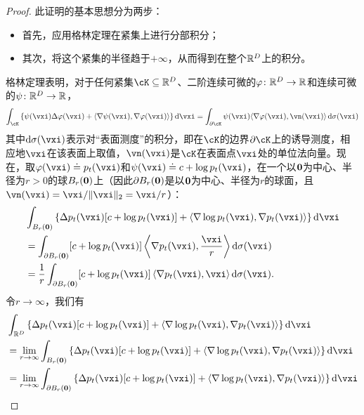 \documentclass[../../book-main.tex]{subfiles}
\begin{document}
\begin{proof}
    此证明的基本思想分为两步：
    \begin{itemize}
        \item 首先，应用格林定理在紧集上进行分部积分；
        \item 其次，将这个紧集的半径趋于\(+\infty\)，从而得到在整个\(\mathbb{R}^{D}\)上的积分。
    \end{itemize}
    格林定理表明，对于任何紧集\(\cK \subseteq \R^{D}\)、二阶连续可微的\(\plainphi \colon \R^{D} \to \R\)和连续可微的\(\psi \colon \mathbb{R}^{D} \to \mathbb{R}\)，
    \begin{equation}
        \int_{\cK}\bc{\psi(\vxi) \Delta \plainphi(\vxi) + \ip{\nabla \psi(\vxi)}{\nabla \plainphi(\vxi)}}\odif{\vxi} = \int_{\partial \cK}\psi(\vxi)\ip{\nabla \plainphi(\vxi)}{\vn(\vxi)}\odif{\sigma(\vxi)}
    \end{equation}
    其中\(\odif{\sigma(\vxi)}\)表示对“表面测度”的积分，即在\(\cK\)的边界\(\partial \cK\)上的诱导测度，相应地\(\vxi\)在该表面上取值，\(\vn(\vxi)\)是\(\cK\)在表面点\(\vxi\)处的单位法向量。现在，取\(\plainphi(\vxi) \doteq p_{t}(\vxi)\)和\(\psi(\vxi) \doteq c + \log p_{t}(\vxi)\)，在一个以\(\bm{0}\)为中心、半径为\(r > 0\)的球\(B_{r}(\bm{0})\)上（因此\(\partial B_{r}(\bm{0})\)是以\(\bm{0}\)为中心、半径为\(r\)的球面，且\(\vn(\vxi) = \vxi/\norm{\vxi}_{2} = \vxi/r\)）：
    \begin{align}
        &\int_{B_{r}(\vzero)}\bc{\Delta p_{t}(\vxi)[c + \log p_{t}(\vxi)] + \ip{\nabla \log p_{t}(\vxi)}{\nabla p_{t}(\vxi)}}\odif{\vxi} \\
        &= \int_{\partial B_{r}(\vzero)}[c + \log p_{t}(\vxi)]\ip*{\nabla p_{t}(\vxi)}{\frac{\vxi}{r}}\odif{\sigma(\vxi)} \\
        &= \frac{1}{r}\int_{\partial B_{r}(\vzero)}[c + \log p_{t}(\vxi)]\ip*{\nabla p_{t}(\vxi)}{\vxi}\odif{\sigma(\vxi)}.
    \end{align}
    令\(r \to \infty\)，我们有
    \begin{align}
        &\int_{\R^{D}}\bc{\Delta p_{t}(\vxi)[c + \log p_{t}(\vxi)] + \ip{\nabla \log p_{t}(\vxi)}{\nabla p_{t}(\vxi)}}\odif{\vxi} \label{eq:app_diffusion_r_infinity_limit} \\
        &= \lim_{r \to \infty}\int_{B_{r}(\vzero)}\bc{\Delta p_{t}(\vxi)[c + \log p_{t}(\vxi)] + \ip{\nabla \log p_{t}(\vxi)}{\nabla p_{t}(\vxi)}}\odif{\vxi} \\
        &= \lim_{r \to \infty}\int_{\partial B_{r}(\vzero)}\bc{\Delta p_{t}(\vxi)[c + \log p_{t}(\vxi)] + \ip{\nabla \log p_{t}(\vxi)}{\nabla p_{t}(\vxi)}}\odif{\vxi} \\ 

\end{align}
\end{proof}
\end{document}
